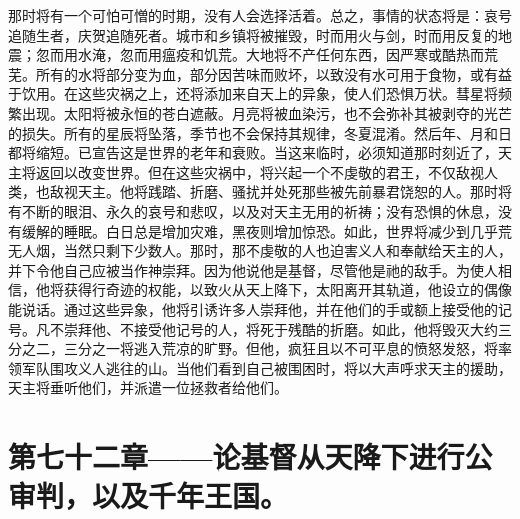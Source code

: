 那时将有一个可怕可憎的时期，没有人会选择活着。总之，事情的状态将是：哀号追随生者，庆贺追随死者。城市和乡镇将被摧毁，时而用火与剑，时而用反复的地震；忽而用水淹，忽而用瘟疫和饥荒。大地将不产任何东西，因严寒或酷热而荒芜。所有的水将部分变为血，部分因苦味而败坏，以致没有水可用于食物，或有益于饮用。在这些灾祸之上，还将添加来自天上的异象，使人们恐惧万状。彗星将频繁出现。太阳将被永恒的苍白遮蔽。月亮将被血染污，也不会弥补其被剥夺的光芒的损失。所有的星辰将坠落，季节也不会保持其规律，冬夏混淆。然后年、月和日都将缩短。已宣告这是世界的老年和衰败。当这来临时，必须知道那时刻近了，天主将返回以改变世界。但在这些灾祸中，将兴起一个不虔敬的君王，不仅敌视人类，也敌视天主。他将践踏、折磨、骚扰并处死那些被先前暴君饶恕的人。那时将有不断的眼泪、永久的哀号和悲叹，以及对天主无用的祈祷；没有恐惧的休息，没有缓解的睡眠。白日总是增加灾难，黑夜则增加惊恐。如此，世界将减少到几乎荒无人烟，当然只剩下少数人。那时，那不虔敬的人也迫害义人和奉献给天主的人，并下令他自己应被当作神崇拜。因为他说他是基督，尽管他是祂的敌手。为使人相信，他将获得行奇迹的权能，以致火从天上降下，太阳离开其轨道，他设立的偶像能说话。通过这些异象，他将引诱许多人崇拜他，并在他们的手或额上接受他的记号。凡不崇拜他、不接受他记号的人，将死于残酷的折磨。如此，他将毁灭大约三分之二，三分之一将逃入荒凉的旷野。但他，疯狂且以不可平息的愤怒发怒，将率领军队围攻义人逃往的山。当他们看到自己被围困时，将以大声呼求天主的援助，天主将垂听他们，并派遣一位拯救者给他们。\par


\section{第七十二章——论基督从天降下进行公审判，以及千年王国。}

